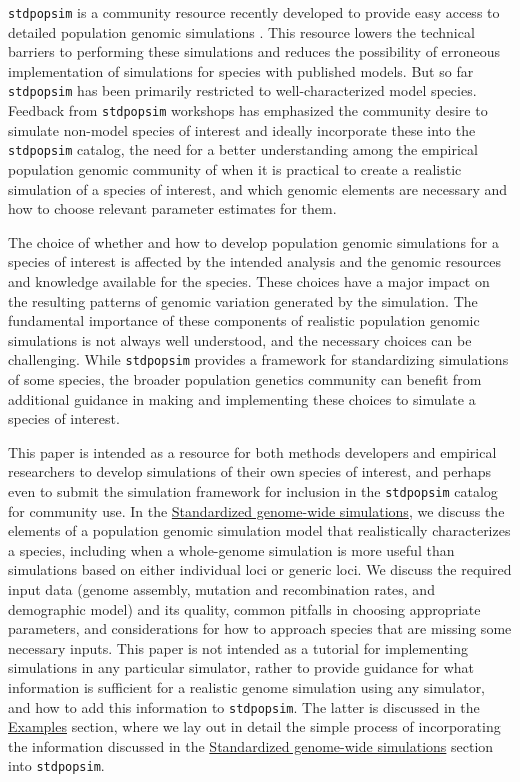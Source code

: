 \documentclass{article}
\newcommand{\stdpopsim}{\texttt{stdpopsim}\xspace}
\begin{document}
\stdpopsim is a community resource recently developed to provide easy
access to detailed population genomic simulations \citep{Adrion2020}. This
resource lowers the technical barriers to performing these simulations
and reduces the possibility of erroneous implementation of simulations
for species with published models. But so far \stdpopsim has been
primarily restricted to well-characterized model species. Feedback from
\stdpopsim workshops has emphasized the community desire to simulate
non-model species of interest and ideally incorporate these into the \stdpopsim catalog,
the need for a better understanding among the empirical population
genomic community of when it is practical to create a realistic
simulation of a species of interest, and which genomic elements are
necessary and how to choose relevant parameter estimates for them.

The choice of whether and how to develop population genomic
simulations for a species of interest is affected by the intended
analysis and the genomic resources and knowledge available for the
species. These choices have a major impact on the resulting patterns of
genomic variation generated by the simulation. The fundamental
importance of these components of realistic population genomic
simulations is not always well understood, and the necessary choices can
be challenging. While \stdpopsim provides a framework for standardizing
simulations of some species, the broader population genetics community
can benefit from additional guidance in making and implementing these
choices to simulate a species of interest.

This paper is intended as a resource for both methods
developers and empirical researchers to develop simulations of their own
species of interest, and perhaps even to submit the simulation
framework for inclusion in the \stdpopsim catalog for community use.
In the \hyperref[sec:sim-guidelines]{Standardized genome-wide simulations}, 
we discuss the elements of a
population genomic simulation model that realistically characterizes a
species, including when a whole-genome simulation is more useful than
simulations based on either individual loci or generic loci.
We discuss the required input data (genome assembly, 
mutation and recombination rates, and demographic model) and
its quality, common pitfalls in choosing appropriate parameters, and
considerations for how to approach species that are missing some
necessary inputs. This paper is not intended as a tutorial for
implementing simulations in any particular simulator, rather to provide
guidance for what information is sufficient for a realistic genome simulation
using any simulator, and how to add this information to \stdpopsim. The latter 
is discussed in the \hyperref[sec:examples]{Examples} section, where we lay out in
detail the simple process of incorporating the information discussed 
in the \hyperref[sec:sim-guidelines]{Standardized genome-wide simulations} section into \stdpopsim. 
\end{document}
